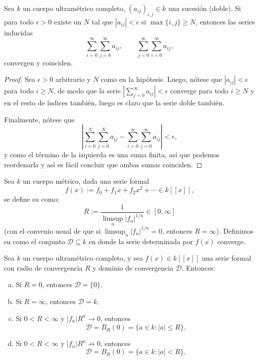\documentclass[teoria-numeros.tex]{subfiles}
\begin{document}
\begin{prop}
	Sea $k$ un cuerpo ultramétrico completo, $(a_{ij})_{i,j} \in k$ una sucesión (doble).
	Si para todo $\epsilon > 0$ existe un $N$ tal que $|a_{ij}| < \epsilon$ si $\max\{ i, j \} \ge N$,
	entonces las series inducidas
	$$ \sum_{i=0}^{\infty} \sum_{j=0}^{\infty} a_{ij}, \qquad \sum_{j=0}^{\infty} \sum_{i=0}^{\infty} a_{ij}, $$
	convergen y coinciden.
\end{prop}
\begin{proof}
	Sea $\epsilon > 0$ arbitrario y $N$ como en la hipótesis.
	Luego, nótese que $|a_{ij}| < \epsilon$ para todo $i \ge N$, de modo que la serie $\left| \sum_{j=0}^{\infty} a_{ij} \right| < \epsilon$
	converge para todo $i \ge N$ y en el resto de índices también, luego es claro que la serie doble también.

	Finalmente, nótese que
	$$ \left| \sum_{i=0}^{N} \sum_{j=0}^{N} a_{ij} - \sum_{i=0}^{\infty} \sum_{j=0}^{\infty} a_{ij} \right| < \epsilon, $$
	y como el término de la izquierda es una suma finita, así que podemos reordenarla y así es fácil concluir que ambas sumas coinciden.
\end{proof}

\begin{mydef}
	Sea $k$ un cuerpo métrico, dada una serie formal
	$$ f(x) := f_0 + f_1 x + f_2 x^2 + \cdots \in k[[x]], $$
	se define su  como:
	$$ R := \frac{1}{\limsup_n |f_n|^{1/n}} \in [0, \infty] $$
	(con el convenio usual de que si $\limsup_n |f_n|^{1/n} = 0$, entonces $R = \infty$).
	Definimos su  como el conjunto $\mathcal{D} \subseteq k$ en donde la serie
	determinada por $f(x)$ converge.
\end{mydef}
\begin{prop}
	Sea $k$ un cuerpo ultramétrico completo, y sea $f(x) \in k[[x]]$ una serie formal con radio de convergencia $R$
	y dominio de convergencia $\mathcal{D}$.
	Entonces:
	\begin{enumerate}[(a)]
		\item Si $R = 0$, entonces $\mathcal{D} = \{ 0 \}$.
		\item Si $R = \infty$, entonces $\mathcal{D} = k$.
		\item Si $0 < R < \infty$ y $|f_n|R^n \to 0$, entonces
			$$ \mathcal{D} = \overline{B}_R(0) = \{ a \in k : |a| \le R \}. $$
		\item Si $0 < R < \infty$ y $|f_n|R^n \not\to 0$, entonces
			$$ \mathcal{D} = B_R(0) = \{ a \in k : |a| < R \}. $$
	\end{enumerate}
\end{prop}
\end{document}

